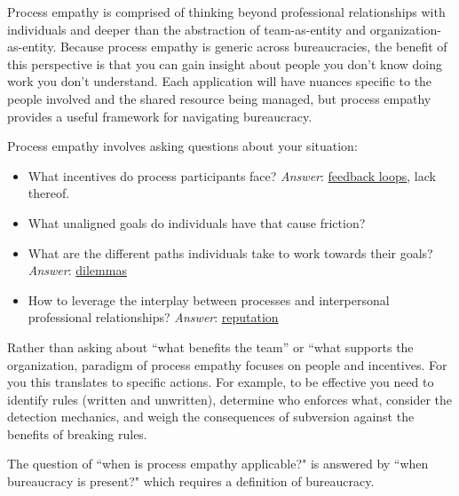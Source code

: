 Process empathy is comprised of thinking beyond professional relationships with individuals and deeper than the abstraction of team-as-entity and organization-as-entity. 
Because process empathy is generic across bureaucracies, the benefit of this perspective is that you can gain insight about people you don't know doing work you don't understand.
Each application will have nuances specific to the people involved and the shared resource being managed, but process empathy provides a useful framework for navigating bureaucracy.


Process empathy involves asking questions about your situation:
\begin{itemize}
    \item What incentives do process participants face?
\textit{Answer}:  \hyperref[sec:feedback-loop-and-ripples]{feedback loops}, lack thereof.
    \item What unaligned goals do individuals have that cause friction?
    \item What are the different paths individuals take to work towards their goals?
\textit{Answer}:  \hyperref[sec:dilemma-trilemma]{dilemmas}
    \item How to leverage the interplay between processes and interpersonal professional relationships?
\textit{Answer}:  \hyperref[sec:reputation]{reputation}
\end{itemize}

Rather than asking about ``what benefits the team'' or ``what supports the organization, paradigm of process empathy focuses on people and incentives. For you this translates to specific actions. For example, to be effective you need to 
identify rules (written and unwritten), determine who enforces what, consider the detection mechanics, and weigh the consequences of subversion against the benefits of breaking rules.


The question of ``when is process empathy applicable?" is answered by ``when bureaucracy is present?" which requires a definition of bureaucracy. 
